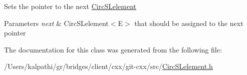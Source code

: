 Sets the pointer to the next \hyperlink{classbridges_1_1_circ_s_lelement}{Circ\+S\+Lelement} 
\begin{DoxyParams}{Parameters}
{\em next} & Circ\+S\+Lelement$<$\+E$>$ that should be assigned to the next pointer \\
\hline
\end{DoxyParams}


The documentation for this class was generated from the following file\+:\begin{DoxyCompactItemize}
\item 
/\+Users/kalpathi/gr/bridges/client/cxx/git-\/cxx/src/\hyperlink{_circ_s_lelement_8h}{Circ\+S\+Lelement.\+h}\end{DoxyCompactItemize}
